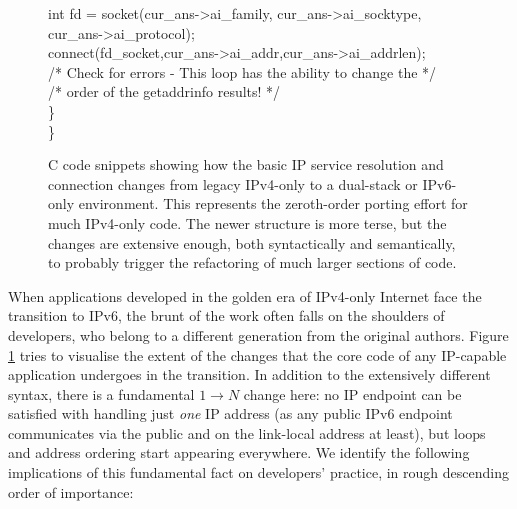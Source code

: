 \begin{figure}
\begin{framed}
{\qquad\qquad int fd = socket(cur\_ans->ai\_family, cur\_ans->ai\_socktype,\\
\qquad\qquad\qquad cur\_ans->ai\_protocol);\\
\qquad\qquad connect(fd\_socket,cur\_ans->ai\_addr,cur\_ans->ai\_addrlen);\\
\qquad\qquad /* Check for errors - This loop has the ability to change the */\\
\qquad\qquad /* order of the getaddrinfo results! */\\
\qquad \}\\
\}
}
\end{framed}
\caption{C code snippets showing how the basic IP service resolution and connection 
 changes from legacy IPv4-only to a dual-stack or IPv6-only environment. This represents
 the zeroth-order porting effort for much IPv4-only code. The newer structure
 is more terse, but the changes are extensive enough, both syntactically and
 semantically, to probably trigger the refactoring of much larger sections of code.}
\label{fig:pseudocode}
\end{figure}
When applications developed in the golden
era of IPv4-only Internet face the transition to IPv6, the brunt of the
work often falls on the shoulders of developers, who belong to a different
generation from the original authors. Figure \ref{fig:pseudocode} tries to
visualise the extent of the changes that the core code of any
IP-capable application undergoes in the transition. In addition to
the extensively different syntax, there is a
fundamental $1\rightarrow N$ change here:
no IP endpoint can be satisfied with handling just {\it one}
IP address (as any public IPv6 endpoint communicates via the
public and on the link-local address at least), but loops and address
ordering start appearing everywhere. We identify the following implications of this
fundamental fact on developers' practice, in rough descending order
of importance:
